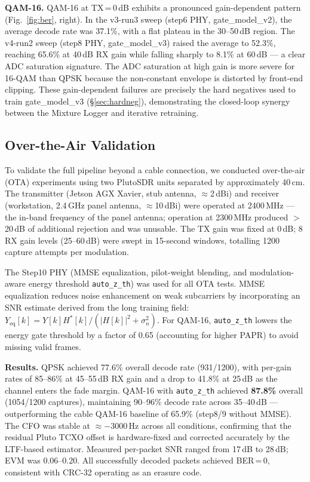 \documentclass[conference]{IEEEtran}
\begin{document}
\textbf{QAM-16.}
QAM-16 at TX\,=\,0\,dB exhibits a pronounced gain-dependent pattern
(Fig.~\ref{fig:ber}, right).
In the v3-run3 sweep (step6 PHY, gate\_model\_v2), the average decode
rate was 37.1\%, with a flat plateau in the 30–50\,dB region.
The v4-run2 sweep (step8 PHY, gate\_model\_v3) raised the average
to 52.3\%, reaching 65.6\% at 40\,dB RX gain while falling sharply
to 8.1\% at 60\,dB — a clear ADC saturation signature.
The ADC saturation at high gain is more severe for 16-QAM than QPSK
because the non-constant envelope is distorted by front-end clipping.
These gain-dependent failures are precisely the hard negatives used to
train gate\_model\_v3 (§\ref{sec:hardneg}), demonstrating the
closed-loop synergy between the Mixture Logger and iterative retraining.

\subsection{Over-the-Air Validation}
\label{sec:ota}

To validate the full pipeline beyond a cable connection, we conducted
over-the-air (OTA) experiments using two PlutoSDR units separated by
approximately 40\,cm.
The transmitter (Jetson AGX Xavier, stub antenna, $\approx$2\,dBi) and
receiver (workstation, 2.4\,GHz panel antenna, $\approx$10\,dBi) were
operated at 2400\,MHz — the in-band frequency of the panel antenna;
operation at 2300\,MHz produced $>$20\,dB of additional rejection and
was unusable.
The TX gain was fixed at 0\,dB; 8 RX gain levels (25–60\,dB) were swept
in 15-second windows, totalling 1200 capture attempts per modulation.

The Step10 PHY (MMSE equalization, pilot-weight blending, and
modulation-aware energy threshold \texttt{auto\_z\_th}) was used for all
OTA tests.
MMSE equalization reduces noise enhancement on weak subcarriers by
incorporating an SNR estimate derived from the long training field:
$Y_{\mathrm{eq}}[k] = Y[k] H^*[k] / (|H[k]|^2 + \sigma_n^2)$.
For QAM-16, \texttt{auto\_z\_th} lowers the energy gate threshold by
a factor of 0.65 (accounting for higher PAPR) to avoid missing
valid frames.

\textbf{Results.}
QPSK achieved 77.6\% overall decode rate (931/1200), with per-gain
rates of 85–86\% at 45–55\,dB RX gain and a drop to 41.8\% at 25\,dB
as the channel enters the fade margin.
QAM-16 with \texttt{auto\_z\_th} achieved \textbf{87.8\%} overall
(1054/1200 captures), maintaining 90–96\% decode rate across
35–40\,dB — outperforming the cable QAM-16 baseline of 65.9\%
(step8/9 without MMSE).
The CFO was stable at $\approx -3000$\,Hz across all conditions,
confirming that the residual Pluto TCXO offset is hardware-fixed
and corrected accurately by the LTF-based estimator.
Measured per-packet SNR ranged from 17\,dB to 28\,dB; EVM was
0.06–0.20.
All successfully decoded packets achieved BER\,=\,0, consistent
with CRC-32 operating as an erasure code.
\end{document}
